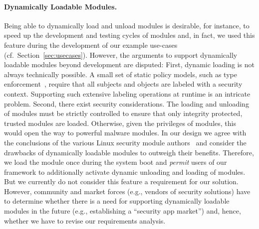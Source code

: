 \documentclass[letterpaper,twocolumn,10pt]{article}
\begin{document}
\paragraph{Dynamically Loadable Modules.} Being able to dynamically load and unload modules is desirable, for instance, to speed up the development and testing cycles of modules and, in fact, we used this feature during the development of our example use-cases (cf.~Section~\ref{sec:usecases}). However, the arguments to support dynamically loadable modules beyond development are disputed: First, dynamic loading is not always technically possible. A small set of static policy models, such as type enforcement~\cite{Smalley2013,TUD-CS-2013-0115}, require that all subjects and objects are labeled with a security context. Supporting such extensive labeling operations at runtime is an intricate problem. Second, there exist security considerations. The loading and unloading of modules must be strictly controlled to ensure that only integrity protected, trusted modules are loaded. Otherwise, given the privileges of modules, this would open the way to powerful malware modules. In our design we agree with the conclusions of the various Linux security module authors~\cite{loadablelsm} and consider the drawbacks of dynamically loadable modules to outweigh their benefits. Therefore, we load the module once during the system boot and \emph{permit} users of our framework to additionally activate dynamic unloading and loading of modules. But we currently do not consider this feature a requirement for our solution. However, community and market forces (e.g., vendors of security solutions) have to determine whether there is a need for supporting dynamically loadable modules in the future (e.g., establishing a ``security app market'') and, hence, whether we have to revise our requirements analysis.
\end{document}
